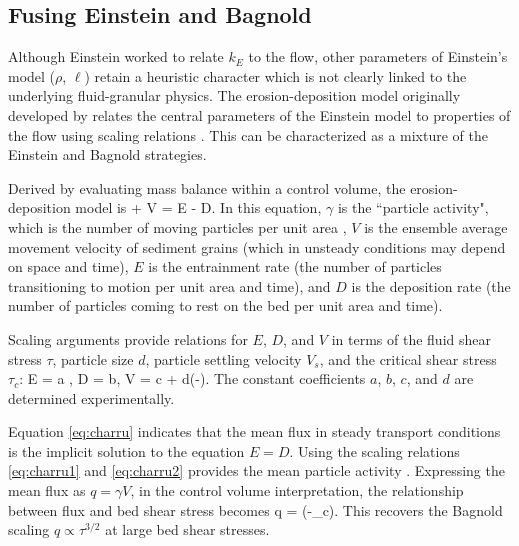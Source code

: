 \subsection{Fusing Einstein and Bagnold}

Although Einstein worked to relate $k_E$ to the flow, other parameters of Einstein's model ($\rho$, $\ell$) retain a heuristic character which is not clearly linked to the underlying fluid-granular physics. The erosion-deposition model originally developed by \citet{Charru2004,Charru2006,Charru2006a} relates the central parameters of the Einstein model to properties of the flow using scaling relations \citep{Charru2004, Charru2006, Lajeunesse2010,Seizilles2014,Lajeunesse2015}.
This can be characterized as a mixture of the Einstein and Bagnold strategies.

Derived by evaluating mass balance within a control volume, the erosion-deposition model is
\be \pt \gamma +  \px V \gamma = E - D. \label{eq:charru}\ee
In this equation, $\gamma$ is the ``particle activity", which is the number of moving particles per unit area \citep{Furbish2012}, $V$ is the ensemble average movement velocity of sediment grains (which in unsteady conditions may depend on space and time), $E$ is the entrainment rate (the number of particles transitioning to motion per unit area and time), and $D$ is the deposition rate (the number of particles coming to rest on the bed per unit area and time).

Scaling arguments provide relations for $E$, $D$, and $V$ in terms of the fluid shear stress $\tau$, particle size $d$, particle settling velocity $V_s$, and the critical shear stress $\tau_c$:
\be E = a , \label{eq:charru1}\ee
\be D  = b, \ee
\be V = c + d(\sqrt{\tau}-). \label{eq:charru2}\ee
The constant coefficients $a$, $b$, $c$, and $d$ are determined experimentally.

Equation \ref{eq:charru} indicates that the mean flux in steady transport conditions is the implicit solution to the equation $E = D.$
Using the scaling relations \ref{eq:charru1} and \ref{eq:charru2} provides the mean particle activity
\be \gamma \propto {}.\ee
Expressing the mean flux as $q = \gamma V$, in the control volume interpretation, the relationship between flux and bed shear stress becomes
\be q = \big(\tau-\tau_c\big). \ee
This recovers the Bagnold scaling $q \propto \tau^{3/2}$ at large bed shear stresses.

